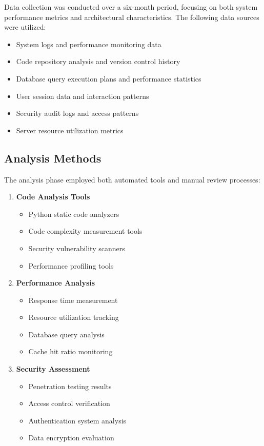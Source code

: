 \documentclass{article}
\begin{document}
Data collection was conducted over a six-month period, focusing on both system performance metrics and architectural characteristics. The following data sources were utilized:

\begin{itemize}
    \item System logs and performance monitoring data
    \item Code repository analysis and version control history
    \item Database query execution plans and performance statistics
    \item User session data and interaction patterns
    \item Security audit logs and access patterns
    \item Server resource utilization metrics
\end{itemize}

\subsection{Analysis Methods}

The analysis phase employed both automated tools and manual review processes:

\begin{enumerate}
    \item \textbf{Code Analysis Tools}
    \begin{itemize}
        \item Python static code analyzers
        \item Code complexity measurement tools
        \item Security vulnerability scanners
        \item Performance profiling tools
    \end{itemize}

    \item \textbf{Performance Analysis}
    \begin{itemize}
        \item Response time measurement
        \item Resource utilization tracking
        \item Database query analysis
        \item Cache hit ratio monitoring
    \end{itemize}

    \item \textbf{Security Assessment}
    \begin{itemize}
        \item Penetration testing results
        \item Access control verification
        \item Authentication system analysis
        \item Data encryption evaluation
    \end{itemize}
\end{enumerate}
\end{document}
